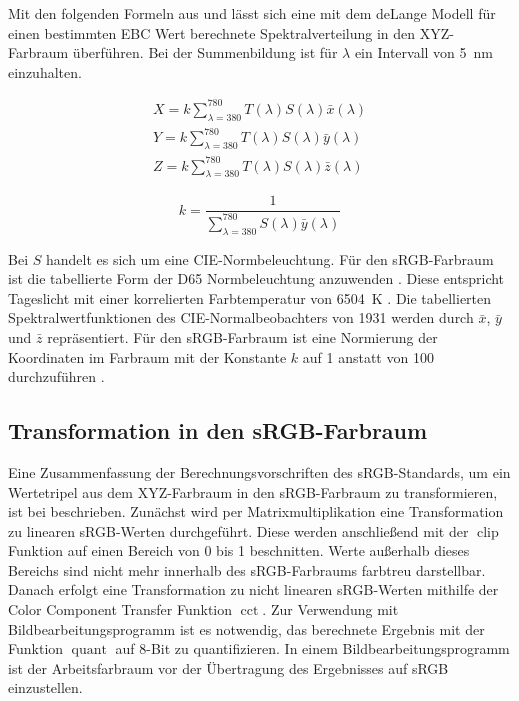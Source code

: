 \documentclass[10pt,a4paper,DIV=12,parskip=half]{scrarticle}
\begin{document}
Mit den folgenden Formeln aus \cite{ASTM2022} und \cite{ASBC2011} lässt sich eine mit dem deLange Modell für einen bestimmten EBC Wert berechnete Spektralverteilung in den XYZ-Farbraum überführen. Bei der Summenbildung ist für $\lambda$ ein Intervall von 5~nm einzuhalten.

\begin{equation*}
	\begin{gathered}
		X = k \sum_{\lambda=380}^{780} T(\lambda) S(\lambda) \bar{x}(\lambda) \\
		Y = k \sum_{\lambda=380}^{780} T(\lambda) S(\lambda) \bar{y}(\lambda) \\
		Z = k \sum_{\lambda=380}^{780} T(\lambda) S(\lambda) \bar{z}(\lambda)
	\end{gathered}
\end{equation*}

\begin{equation*}
	k = \frac{1}{\sum_{\lambda=380}^{780} S(\lambda) \bar{y}(\lambda)}
\end{equation*}

Bei $S$ handelt es sich um eine CIE-Normbeleuchtung. Für den sRGB-Farbraum ist die tabellierte Form der D65 Normbeleuchtung anzuwenden \parencites{W3C2015}{CIE2022}. Diese entspricht Tageslicht mit einer korrelierten Farbtemperatur von 6504~K \parencite{ASTM2022}. Die tabellierten Spektralwertfunktionen des CIE-Normalbeobachters von 1931 \parencite{CIE2018} werden durch $\bar{x}$, $\bar{y}$ und $\bar{z}$ repräsentiert. Für den sRGB-Farbraum ist eine Normierung der Koordinaten im Farbraum mit der Konstante $k$ auf 1 anstatt von 100 durchzuführen \parencite{W3C2015}.

\subsection*{Transformation in den sRGB-Farbraum}

Eine Zusammenfassung der Berechnungsvorschriften des sRGB-Standards, um ein Wertetripel aus dem XYZ-Farbraum in den sRGB-Farbraum zu transformieren, ist bei \cite{W3C2015} beschrieben. Zunächst wird per Matrixmultiplikation eine Transformation zu linearen sRGB-Werten durchgeführt. Diese werden anschließend mit der $\operatorname{clip}$ Funktion auf einen Bereich von 0 bis 1 beschnitten. Werte außerhalb dieses Bereichs sind nicht mehr innerhalb des sRGB-Farbraums farbtreu darstellbar. Danach erfolgt eine Transformation zu nicht linearen sRGB-Werten mithilfe der Color Component Transfer Funktion $\operatorname{cct}$. Zur Verwendung mit Bildbearbeitungsprogramm ist es notwendig, das berechnete Ergebnis mit der Funktion $\operatorname{quant}$ auf 8-Bit zu quantifizieren. In einem Bildbearbeitungsprogramm ist der Arbeitsfarbraum vor der Übertragung des Ergebnisses auf sRGB einzustellen.
\end{document}
